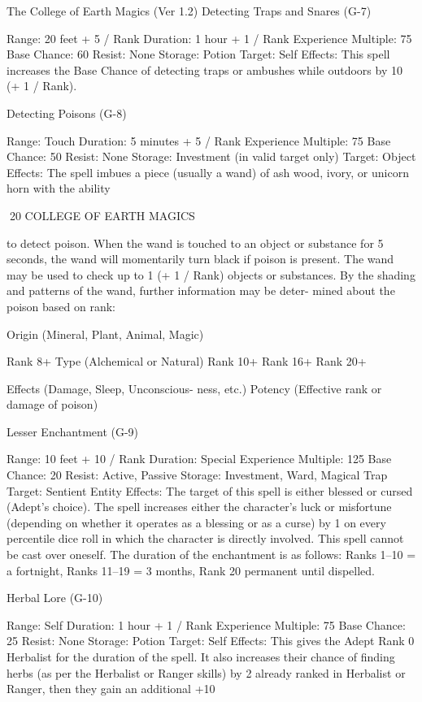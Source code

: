 \begin{Chapter}{The College of Earth Magics (Ver 1.2)}
Detecting Traps and Snares (G-7) 

Range: 20 feet + 5 / Rank 
Duration: 1 hour + 1 / Rank 
Experience Multiple: 75 
Base Chance: 60%
Resist: None 
Storage: Potion 
Target: Self 
Effects:  This  spell  increases  the  Base  Chance  of 
detecting  traps  or  ambushes  while  outdoors  by  10 
(+ 1 / Rank). 

Detecting Poisons (G-8) 

Range: Touch 
Duration: 5 minutes + 5 / Rank 
Experience Multiple: 75 
Base Chance: 50%
Resist: None 
Storage: Investment (in valid target only) 
Target: Object 
Effects: The spell imbues a piece (usually a wand) 
of ash wood, ivory, or unicorn horn with the ability 

20 COLLEGE OF EARTH MAGICS 

to  detect  poison.  When  the  wand  is  touched  to  an 
object  or  substance  for  5  seconds,  the  wand  will 
momentarily  turn  black  if  poison  is  present.  The 
wand  may  be  used  to  check  up  to  1  (+  1  /  Rank) 
objects  or  substances. By  the  shading  and patterns 
of  the  wand,  further  information  may  be  deter-
mined about the poison based on rank: 

Origin (Mineral, Plant, Animal, Magic) 

Rank 8+  Type (Alchemical or Natural) 
Rank 
10+ 
Rank 
16+ 
Rank 
20+ 

Effects (Damage, Sleep, Unconscious-
ness, etc.) 
Potency (Effective rank or damage of 
poison) 

Lesser Enchantment (G-9) 

Range: 10 feet + 10 / Rank 
Duration: Special 
Experience Multiple: 125 
Base Chance: 20%
Resist: Active, Passive 
Storage: Investment, Ward, Magical Trap 
Target: Sentient Entity 
Effects: The target of this spell is either blessed or 
cursed (Adept’s choice). The spell increases either 
the  character’s  luck  or  misfortune  (depending  on 
whether it operates as a blessing or as a curse) by 1 
on every percentile dice roll in which the character 
is directly involved. This spell cannot be cast over 
oneself.  The  duration  of  the  enchantment  is  as 
follows: Ranks 1–10 = a fortnight, Ranks 11–19 = 
3 months, Rank 20 permanent until dispelled. 

Herbal Lore (G-10) 

Range: Self 
Duration: 1 hour + 1 / Rank 
Experience Multiple: 75 
Base Chance: 25%
Resist: None 
Storage: Potion 
Target: Self 
Effects: This gives the Adept Rank 0 Herbalist for 
the  duration  of  the  spell.  It  also  increases  their 
chance  of  finding  herbs  (as  per  the  Herbalist  or 
Ranger skills) by 2%
already  ranked  in  Herbalist  or  Ranger,  then  they 
gain an additional +10%


\end{Chapter}
